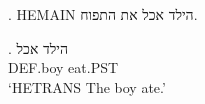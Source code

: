 \documentclass[11pt]{article}
\begin{document}
\ex. HEMAIN הילד אכל את התפוח.

\exg. הילד אכל\\ DEF.boy eat.PST\\
\glt `HETRANS The boy ate.'
\end{document}
